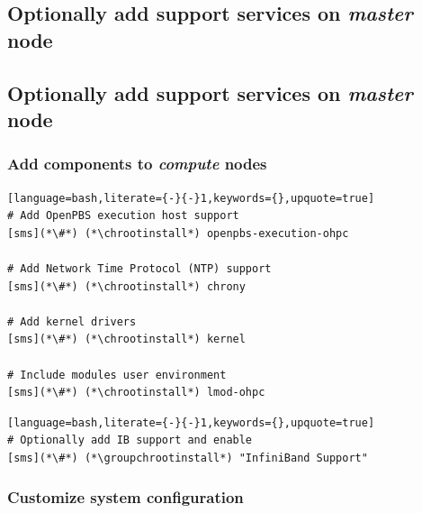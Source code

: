 \documentclass[letterpaper]{article}
\newcommand{\chrootinstall}{psh compute dnf -y install}
\newcommand{\groupchrootinstall}{psh compute dnf -y groupinstall}
\begin{document}
\subsection{Optionally add \InfiniBand{} support services on {\em master} node} \label{sec:add_ofed}

\vspace*{0.3cm}
\subsection{Optionally add \OmniPath{} support services on {\em master} node} \label{sec:add_opa}


\clearpage
\subsubsection{Add \OHPC{} components to {\em compute} nodes} \label{sec:add_components}


\begin{lstlisting}[language=bash,literate={-}{-}1,keywords={},upquote=true]
# Add OpenPBS execution host support
[sms](*\#*) (*\chrootinstall*) openpbs-execution-ohpc

# Add Network Time Protocol (NTP) support
[sms](*\#*) (*\chrootinstall*) chrony

# Add kernel drivers
[sms](*\#*) (*\chrootinstall*) kernel

# Include modules user environment
[sms](*\#*) (*\chrootinstall*) lmod-ohpc
\end{lstlisting}

\begin{lstlisting}[language=bash,literate={-}{-}1,keywords={},upquote=true]
# Optionally add IB support and enable
[sms](*\#*) (*\groupchrootinstall*) "InfiniBand Support"
\end{lstlisting}

\vspace*{-0.25cm}
\subsubsection{Customize system configuration} \label{sec:master_customization}

\end{document}
